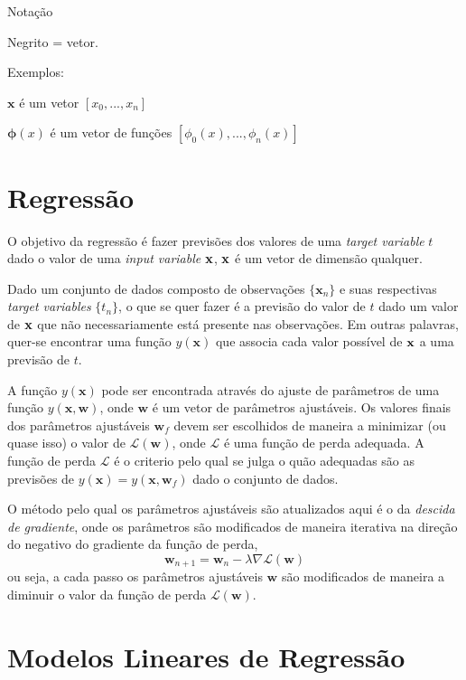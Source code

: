 \documentclass{article}
\begin{document}
Notação

Negrito = vetor.

Exemplos:

\(\textbf{x}\) é um vetor \([x_0,...,x_n]\)

\(\boldsymbol{\phi}(x)\) é um vetor de funções \([\phi_0(x),...,\phi_n(x)]\)

\section{Regressão}

O objetivo da regressão é fazer previsões dos valores de uma \emph{target variable} \(t\) dado o valor de uma \emph{input variable} \(\bf x\),
\(\bf x\) é um vetor de dimensão qualquer.

Dado um conjunto de dados composto de observações \( \{ \textbf{x}_n \} \) e suas respectivas
\emph{target variables} \( \{t_n\} \), o que se quer fazer é a previsão do valor de \(t\)
dado um valor de \(\bf x\) que não necessariamente está presente nas observações. Em outras palavras,
quer-se encontrar uma função \( y(\textbf{x}) \) que associa cada valor possível de \(\bf x\) a uma previsão de
\(t\).

A função \( y(\textbf{x}) \) pode ser encontrada através do ajuste de parâmetros de uma função 
\( y(\textbf{x}, \textbf{w}) \), onde \( \textbf{w} \) é um vetor de parâmetros ajustáveis. Os valores
finais dos parâmetros ajustáveis \( \textbf{w}_f \) devem ser escolhidos de maneira a minimizar
(ou quase isso) o valor de \( \mathcal{L}(\textbf{w}) \), onde \( \mathcal{L} \) é uma função de perda
adequada. A função de perda \( \mathcal{L} \) é o criterio pelo qual se julga o quão adequadas são as
previsões de \( y(\textbf{x}) = y(\textbf{x}, \textbf{w}_f) \) dado o conjunto de dados.

O método pelo qual os parâmetros ajustáveis são atualizados aqui é o da \emph{descida de gradiente}, onde os parâmetros
são modificados de maneira iterativa na direção do negativo do gradiente da função de perda,
\[ \textbf{w}_{n + 1} = \textbf{w}_n - \lambda \nabla \mathcal{L}(\textbf{w}) \]
ou seja, a cada passo os parâmetros ajustáveis \( \textbf{w} \) são modificados de maneira a diminuir o valor da
função de perda \( \mathcal{L}(\textbf{w}) \).

\section{Modelos Lineares de Regressão}
\end{document}
